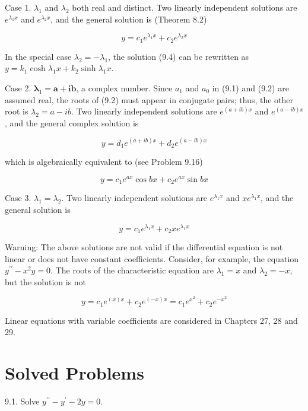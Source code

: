 \documentclass[10pt]{article}
\begin{document}
Case 1. $\lambda_{1}$ and $\lambda_{2}$ both real and distinct. Two linearly independent solutions are $e^{\lambda_{1} x}$ and $e^{\lambda_{2} x}$, and the general solution is (Theorem 8.2)


\begin{equation*}
y=c_{1} e^{\lambda_{1} x}+c_{2} e^{\lambda_{2} x} \tag{9.4}
\end{equation*}


In the special case $\lambda_{2}=-\lambda_{1}$, the solution (9.4) can be rewritten as $y=k_{1} \cosh \lambda_{1} x+k_{2} \sinh \lambda_{1} x$.

Case 2. $\boldsymbol{\lambda}_{1}=\boldsymbol{a}+\boldsymbol{i} \boldsymbol{b}$, a complex number. Since $a_{1}$ and $a_{0}$ in (9.1) and (9.2) are assumed real, the roots of (9.2) must appear in conjugate pairs; thus, the other root is $\lambda_{2}=a-i b$. Two linearly independent solutions are $e^{(a+i b) x}$ and $e^{(a-i b) x}$, and the general complex solution is


\begin{equation*}
y=d_{1} e^{(a+i b) x}+d_{2} e^{(a-i b) x} \tag{9.5}
\end{equation*}


which is algebraically equivalent to (see Problem 9.16)


\begin{equation*}
y=c_{1} e^{a x} \cos b x+c_{2} e^{a x} \sin b x \tag{9.6}
\end{equation*}


Case 3. $\lambda_{1}=\lambda_{2}$. Two linearly independent solutions are $e^{\lambda_{1} x}$ and $x e^{\lambda_{1} x}$, and the general solution is


\begin{equation*}
y=c_{1} e^{\lambda_{1} x}+c_{2} x e^{\lambda_{1} x} \tag{9.7}
\end{equation*}


Warning: The above solutions are not valid if the differential equation is not linear or does not have constant coefficients. Consider, for example, the equation $y^{\prime \prime}-x^{2} y=0$. The roots of the characteristic equation are $\lambda_{1}=x$ and $\lambda_{2}=-x$, but the solution is not

$$
y=c_{1} e^{(x) x}+c_{2} e^{(-x) x}=c_{1} e^{x^{2}}+c_{2} e^{-x^{2}}
$$

Linear equations with variable coefficients are considered in Chapters 27, 28 and 29.

\section*{Solved Problems}
9.1. Solve $y^{\prime \prime}-y^{\prime}-2 y=0$.
\end{document}
